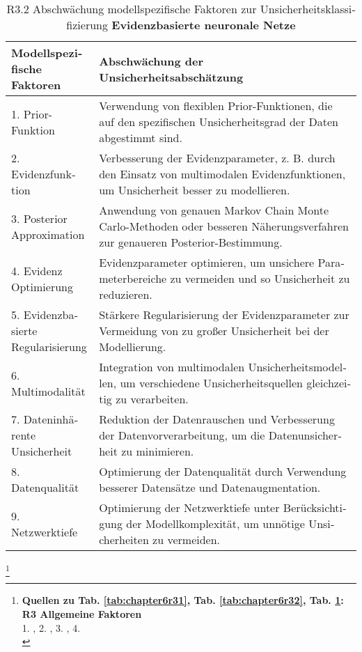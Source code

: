 \begin{otherlanguage}{ngerman}
\begin{table}[!htpb]
  \centering
  \footnotesize
  \begin{tabularx}{\textwidth}{|l|X|}
    \hline
    \textbf{Modellspezifische Faktoren} & \textbf{Abschwächung der Unsicherheitsabschätzung} \\
    \hline
    1. Prior-Funktion & Verwendung von flexiblen Prior-Funktionen, die auf den spezifischen Unsicherheitsgrad der Daten abgestimmt sind. \\
    \hline
    2. Evidenzfunktion & Verbesserung der Evidenzparameter, z. B. durch den Einsatz von multimodalen Evidenzfunktionen, um Unsicherheit besser zu modellieren. \\
    \hline
    3. Posterior Approximation & Anwendung von genauen \gls{Markov Chain Monte Carlo}-Methoden oder besseren Näherungsverfahren zur genaueren Posterior-Bestimmung. \\
    \hline
    4. Evidenz Optimierung & Evidenzparameter optimieren, um unsichere Parameterbereiche zu vermeiden und so Unsicherheit zu reduzieren. \\
    \hline
    5. Evidenzbasierte Regularisierung & Stärkere Regularisierung der Evidenzparameter zur Vermeidung von zu großer Unsicherheit bei der Modellierung. \\
    \hline
    6. Multimodalität & Integration von multimodalen Unsicherheitsmodellen, um verschiedene Unsicherheitsquellen gleichzeitig zu verarbeiten. \\
    \hline
    7. Dateninhärente Unsicherheit & Reduktion der Datenrauschen und Verbesserung der Datenvorverarbeitung, um die Datenunsicherheit zu minimieren. \\
    \hline
    8. Datenqualität & Optimierung der Datenqualität durch Verwendung besserer Datensätze und Datenaugmentation. \\
    \hline
    9. Netzwerktiefe & Optimierung der Netzwerktiefe unter Berücksichtigung der Modellkomplexität, um unnötige Unsicherheiten zu vermeiden. \\
    \hline
  \end{tabularx}
  \caption{R3.2 Abschwächung modellspezifische Faktoren zur Unsicherheitsklassifizierung \textbf{\gls{Evidenzbasierte neuronale Netze}}}\label{tab:chapter6r33}
\end{table}

\footnote{%
\begin{minipage}[t]{\textwidth}
\scriptsize
\textbf{Quellen zu Tab. \ref{tab:chapter6r31}, Tab. \ref{tab:chapter6r32}, Tab. \ref{tab:chapter6r33}:}\\[0.125em]
\textbf{R3 Allgemeine Faktoren}\\
1. \parencite[S.~47–52]{AndreasKreutz2022},
2. \parencite[S.~6–9]{perdikaris2017nonlinear},
3. \parencite[S.~3]{ovadia2019can},
4. \parencite[S.~60]{AndreasKreutz2022} \\[0.125em]


\end{minipage}}
\end{otherlanguage}
